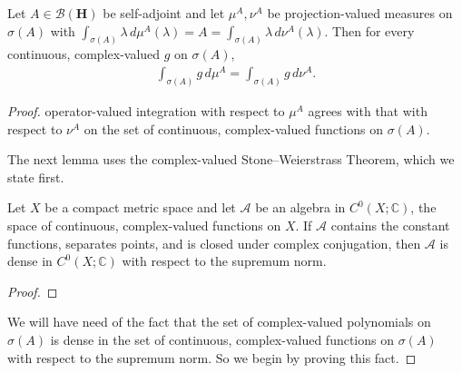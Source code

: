 \begin{proposition}
    \label{prpstn:pvm-agree-on-continuous}
    \leanok
    Let $A \in \mathcal{B}(\mathbf{H})$ be self-adjoint and let $\mu^A, \nu^A$ be projection-valued measures on $\sigma(A)$ with $\int_{\sigma(A)} \lambda \, d\mu^A(\lambda) = A = \int_{\sigma(A)} \lambda \, d\nu^A(\lambda)$. Then for every continuous, complex-valued $g$ on $\sigma(A)$,
    \begin{align}
        \int_{\sigma(A)} g \, d\mu^A = \int_{\sigma(A)} g \, d\nu^A.
    \end{align}
\end{proposition}
\begin{proof}
    \leanok
operator-valued integration with respect to $\mu^A$ agrees with that with respect to $\nu^A$ on the set of continuous, complex-valued functions on $\sigma(A)$.

The next lemma uses the complex-valued Stone–Weierstrass Theorem, which we state first.

\begin{theorem}
    \label{thrm:stone-weierstrass-complex}
    \leanok
    Let $X$ be a compact metric space and let $\mathcal{A}$ be an algebra in $C^0(X; \mathbb{C})$, the space of continuous, complex-valued functions on $X$. If $\mathcal{A}$ contains the constant functions, separates points, and is closed under complex conjugation, then $\mathcal{A}$ is dense in $C^0(X; \mathbb{C})$ with respect to the supremum norm.
\end{theorem}
\begin{proof}
\leanok
\end{proof}

We will have need of the fact that the set of complex-valued polynomials on $\sigma(A)$ is dense in the set of continuous, complex-valued functions on $\sigma(A)$ with respect to the supremum norm. So we begin by proving this fact.


\end{proof}
